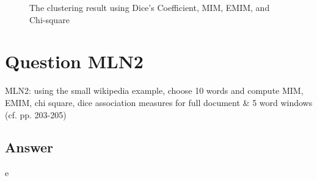 \documentclass[letterpaper,11pt]{article}
\begin{document}
\begin{figure}[H]
	\centering
	\caption{The clustering result using Dice's Coefficient, MIM, EMIM, and Chi-square}
	\label{fig:mln1_result}
\end{figure}
    
\noindent\makebox[\linewidth]{\rule{\textwidth}{0.4pt}}


\section*{Question MLN2}
\begin{spverbatim}
MLN2: using the small wikipedia example, choose 10 words and compute MIM, EMIM, chi square, dice association measures for full document & 5 word windows (cf. pp. 203-205)
\end{spverbatim}

\subsection*{Answer}
e

\medskip


\end{document}
